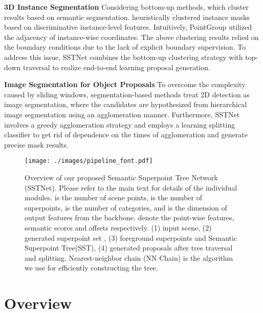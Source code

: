 \documentclass[10pt,twocolumn,letterpaper]{article}
\begin{document}
\noindent\textbf{3D Instance Segmentation}
Considering bottom-up methods, which cluster results based on semantic segmentation. \cite{zhang2020ssen, wang2019associatively, lahoud20193d} heuristically\cite{comaniciu2002mean, inproceedings} clustered instance masks based on discriminative instance-level features\cite{debrabandere2017semantic}. Intuitively, PointGroup\cite{jiang2020pointgroup} utilized the adjacency of instance-wise coordinates.
The above clustering results relied on the boundary conditions due to the lack of explicit boundary supervision.
To address this issue, SSTNet combines the bottom-up clustering strategy with top-down traversal to realize end-to-end learning proposal generation.

\noindent\textbf{Image Segmentation for Object Proposals}
To overcome the complexity caused by sliding windows\cite{Girshick_2014_CVPR, ren2015faster}, segmentation-based\cite{2019Hierarchical, Rantalankila_2014_CVPR, Wang_2015_CVPR} methods treat 2D detection as image segmentation, where the candidates are hypothesized from hierarchical image segmentation using an agglomeration manner.
Furthermore, SSTNet involves a greedy agglomeration strategy and employs a learning splitting classifier to get rid of dependence on the times of agglomeration and generate precise mask results.

\begin{figure*}
    \centering
    \texttt{[image: ./images/pipeline\_font.pdf]}
    \caption{Overview of our proposed Semantic Superpoint Tree Network (SSTNet). Please refer to the main text for details of the individual modules.  is the number of scene points,  is the number of superpoints,  is the number of categories, and  is the dimension of output features from the backbone.  denote the point-wise features, semantic scores and offsets respectively. (1) input scene, (2) generated superpoint set , (3) foreground superpoints and Semantic Superpoint Tree(SST), (4) generated proposals  after tree traversal and splitting. Nearest-neighbor chain (NN Chain) is the algorithm we use for efficiently constructing the tree. }
\label{figArchitecture}
\end{figure*}

\section{Overview}
\label{secOverview}
\end{document}
